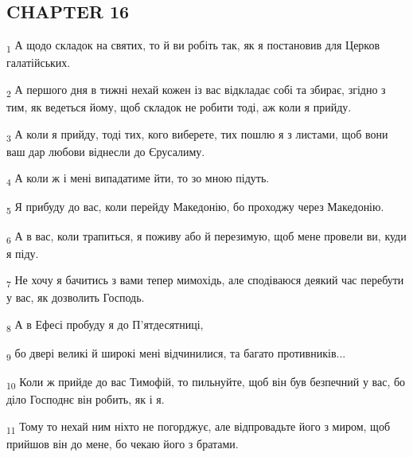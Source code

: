 \subsection{CHAPTER 16}
\begin{tcolorbox}
\textsubscript{1} А щодо складок на святих, то й ви робіть так, як я постановив для Церков галатійських.
\end{tcolorbox}
\begin{tcolorbox}
\textsubscript{2} А першого дня в тижні нехай кожен із вас відкладає собі та збирає, згідно з тим, як ведеться йому, щоб складок не робити тоді, аж коли я прийду.
\end{tcolorbox}
\begin{tcolorbox}
\textsubscript{3} А коли я прийду, тоді тих, кого виберете, тих пошлю я з листами, щоб вони ваш дар любови віднесли до Єрусалиму.
\end{tcolorbox}
\begin{tcolorbox}
\textsubscript{4} А коли ж і мені випадатиме йти, то зо мною підуть.
\end{tcolorbox}
\begin{tcolorbox}
\textsubscript{5} Я прибуду до вас, коли перейду Македонію, бо проходжу через Македонію.
\end{tcolorbox}
\begin{tcolorbox}
\textsubscript{6} А в вас, коли трапиться, я поживу або й перезимую, щоб мене провели ви, куди я піду.
\end{tcolorbox}
\begin{tcolorbox}
\textsubscript{7} Не хочу я бачитись з вами тепер мимохідь, але сподіваюся деякий час перебути у вас, як дозволить Господь.
\end{tcolorbox}
\begin{tcolorbox}
\textsubscript{8} А в Ефесі пробуду я до П'ятдесятниці,
\end{tcolorbox}
\begin{tcolorbox}
\textsubscript{9} бо двері великі й широкі мені відчинилися, та багато противників...
\end{tcolorbox}
\begin{tcolorbox}
\textsubscript{10} Коли ж прийде до вас Тимофій, то пильнуйте, щоб він був безпечний у вас, бо діло Господнє він робить, як і я.
\end{tcolorbox}
\begin{tcolorbox}
\textsubscript{11} Тому то нехай ним ніхто не погорджує, але відпровадьте його з миром, щоб прийшов він до мене, бо чекаю його з братами.
\end{tcolorbox}
